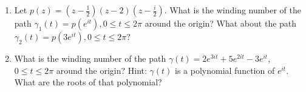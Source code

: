 \documentclass[11pt]{article}
\newcommand{\ds}{\displaystyle}
\begin{document}
\begin{enumerate}
\setcounter{enumi}{\theenumCount}


\item Let $p(z) = (z-\frac{1}{2})(z-2)(z-\frac{i}{2})$.  What is the winding number of the path $\gamma_1(t) = p(e^{it}), 0 \le t \le 2 \pi$ around the origin? What about the path $\gamma_2(t) = p(3e^{it}), 0 \le t \le 2\pi$? 
\vfill

\item What is the winding number of the path $\gamma(t)= 2e^{3it} + 5 e^{2it} - 3e^{it}$, $0 \le t \le 2\pi$ around the origin? Hint: $\gamma(t)$ is a polynomial function of $e^{it}$.  What are the roots of that polynomial?
\vfill


\setcounter{enumCount}{\theenumi}
\end{enumerate}
\end{document}
